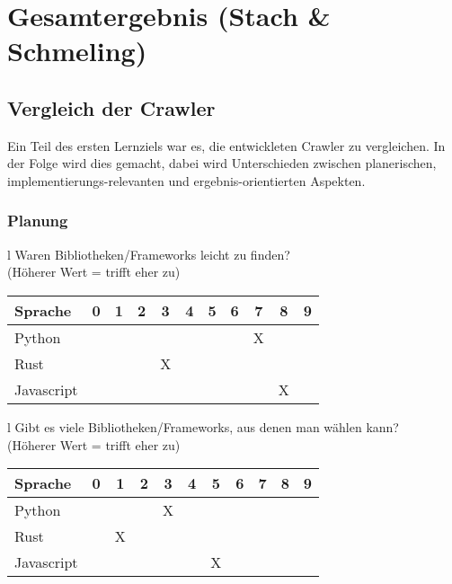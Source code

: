 \chapter{Gesamtergebnis \small{(Stach \& Schmeling)}}
\label{ch:Ergebnis}

\section{Vergleich der Crawler}
Ein Teil des ersten Lernziels war es, die entwickleten Crawler zu vergleichen.
In der Folge wird dies gemacht, dabei wird Unterschieden zwischen
planerischen, implementierungs-relevanten und ergebnis-orientierten Aspekten.


\subsection{Planung}

\begin{tabular}{l}
	Waren Bibliotheken/Frameworks leicht zu finden? \\
	(Höherer Wert = trifft eher zu)                 \\
	\begin{tabular}{| l | c | c | c | c | c | c | c | c | c | c |}
		\hline
		Sprache    & 0 & 1 & 2 & 3 & 4 & 5 & 6 & 7 & 8 & 9 \\
		\hline
		Python     &   &   &   &   &   &   &   & X &   &   \\
		\hline
		Rust       &   &   &   & X &   &   &   &   &   &   \\
		\hline
		Javascript &   &   &   &   &   &   &   &   & X &   \\
		\hline
	\end{tabular}
\end{tabular}

\begin{tabular}{l}
	Gibt es viele Bibliotheken/Frameworks, aus denen man wählen kann? \\
	(Höherer Wert = trifft eher zu)                                   \\
	\begin{tabular}{| l | c | c | c | c | c | c | c | c | c | c |}
		\hline
		Sprache    & 0 & 1 & 2 & 3 & 4 & 5 & 6 & 7 & 8 & 9 \\
		\hline
		Python     &   &   &   & X &   &   &   &   &   &   \\
		\hline
		Rust       &   & X &   &   &   &   &   &   &   &   \\
		\hline
		Javascript &   &   &   &   &   & X &   &   &   &   \\
		\hline
	\end{tabular}
\end{tabular}


